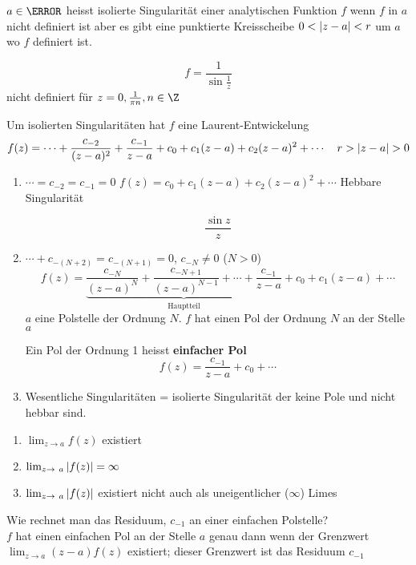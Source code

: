 $a \in \C$ heisst isolierte Singularität einer analytischen Funktion $f$ wenn $f$ in $a$ nicht definiert ist aber es gibt eine punktierte Kreisscheibe $0 < \abs{z-a} < r$ um $a$ wo $f$ definiert ist.
\begin{bsp*}
	\[ f = \frac{1}{\sin \frac{1}{z}} \]
	nicht definiert für $z = 0 , \frac{1}{\pi n} , n \in \Z$
\end{bsp*}
Um isolierten Singularitäten hat $f$ eine Laurent-Entwickelung
\[ f(z) = \dotsb +  \frac{c_{-2}}{(z-a)^2} + \frac{c_{-1}}{z-a} + c_0 + c_1 (z-a) + c_2 (z-a)^2 + \dotsb \quad r > \abs{z-a} > 0 \]
\begin{enumerate}[label = (\alph*)]
	\item $\dotsb = c_{-2} = c_{-1} = 0$ $f(z) = c_0 + c_1 (z-a) + c_2 (z-a)^2 + \dotsb$ Hebbare Singularität
		\begin{bsp*}
			\[ \frac{\sin z}{z} \]
		\end{bsp*}
	\item $\dotsb + c_{-(N+2)} = c_{-(N+1)} = 0$, $c_{-N} \neq 0$ ($N > 0$)
		\[ f(z) = \underbrace{\frac{c_{-N}}{(z-a)^N} + \frac{c_{-N+1}}{(z-a)^{N-1}} + \dotsb + \frac{c_{-1}}{z-a}}_{\text{Hauptteil}} + c_0 + c_1 (z-a) + \dotsb \]
		$a$ eine Polstelle der Ordnung $N$. $f$ hat einen Pol der Ordnung $N$ an der Stelle $a$
		\begin{def*}[note = einfacher Pol , index = einfacher Pol , indexformat = {2!1~}]
			Ein Pol der Ordnung 1 heisst \textbf{einfacher Pol}
			\[ f(z) = \frac{c_{-1}}{z-a} + c_0 + \dotsb \]
		\end{def*}
	\item Wesentliche Singularitäten = isolierte Singularität der keine Pole und nicht hebbar sind.
\end{enumerate}
\begin{enumerate}[label = (\alph*)]
	\item $\lim_{z \rightarrow a} f(z)$ existiert
	\item $\lim_{z \rightarrow a} \abs{f(z)} = \infty$
	\item $\lim_{z \rightarrow a} \abs{f(z)}$ existiert nicht auch als uneigentlicher ($\infty$) Limes
\end{enumerate}
Wie rechnet man das Residuum, $c_{-1}$ an einer einfachen Polstelle? \\
$f$ hat einen einfachen Pol an der Stelle $a$ genau dann wenn der Grenzwert $\lim_{z \rightarrow a} (z-a) f(z)$ existiert; dieser Grenzwert ist das Residuum $c_{-1}$

